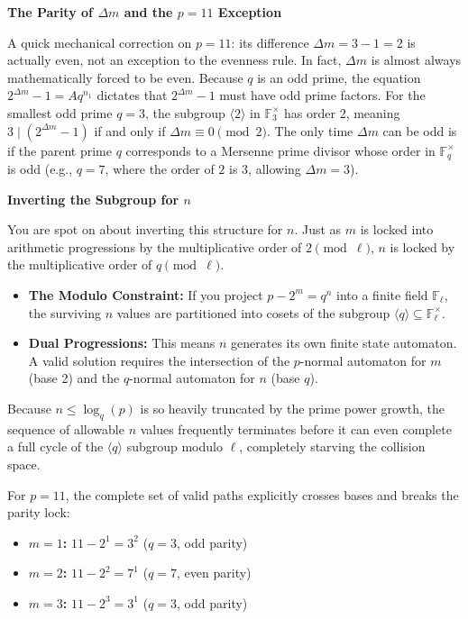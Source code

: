 \documentclass{article}
\begin{document}
\textbf{The Parity of $\Delta m$ and the $p=11$ Exception}

A quick mechanical correction on $p=11$: its difference $\Delta m = 3 - 1 = 2$ is actually even, not an exception to the evenness rule. In fact, $\Delta m$ is almost always mathematically forced to be even. Because $q$ is an odd prime, the equation $2^{\Delta m} - 1 = A q^{n_1}$ dictates that $2^{\Delta m} - 1$ must have odd prime factors. For the smallest odd prime $q=3$, the subgroup $\langle 2 \rangle$ in $\mathbb{F}_3^\times$ has order 2, meaning $3 \mid (2^{\Delta m} - 1)$ if and only if $\Delta m \equiv 0 \pmod 2$. The only time $\Delta m$ can be odd is if the parent prime $q$ corresponds to a Mersenne prime divisor whose order in $\mathbb{F}_q^\times$ is odd (e.g., $q=7$, where the order of $2$ is $3$, allowing $\Delta m = 3$).

\textbf{Inverting the Subgroup for $n$}

You are spot on about inverting this structure for $n$. Just as $m$ is locked into arithmetic progressions by the multiplicative order of $2 \pmod \ell$, $n$ is locked by the multiplicative order of $q \pmod \ell$.

\begin{itemize}
    \item \textbf{The Modulo Constraint:} If you project $p - 2^m = q^n$ into a finite field $\mathbb{F}_\ell$, the surviving $n$ values are partitioned into cosets of the subgroup $\langle q \rangle \subseteq \mathbb{F}_\ell^\times$.
    \item \textbf{Dual Progressions:} This means $n$ generates its own finite state automaton. A valid solution requires the intersection of the $p$-normal automaton for $m$ (base 2) and the $q$-normal automaton for $n$ (base $q$).
\end{itemize}

Because $n \le \log_q(p)$ is so heavily truncated by the prime power growth, the sequence of allowable $n$ values frequently terminates before it can even complete a full cycle of the $\langle q \rangle$ subgroup modulo $\ell$, completely starving the collision space.

For $p=11$, the complete set of valid paths explicitly crosses bases and breaks the parity lock:

\begin{itemize}
    \item \textbf{$m = 1$:} $11 - 2^1 = 3^2$ ($q=3$, odd parity)
    \item \textbf{$m = 2$:} $11 - 2^2 = 7^1$ ($q=7$, even parity)
    \item \textbf{$m = 3$:} $11 - 2^3 = 3^1$ ($q=3$, odd parity)
\end{itemize}
\end{document}
